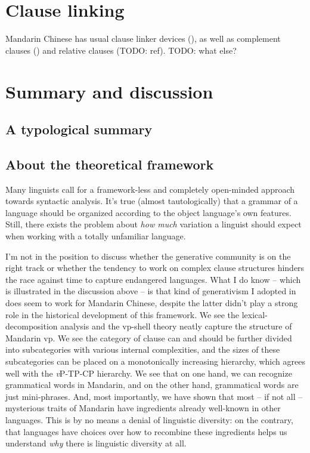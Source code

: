 \documentclass[UTF8, a4paper, oneside, scheme=plain, 12pt]{ctexrep}
\newcommand{\vP}{\textit{v}P}
\begin{document}
\chapter{Clause linking}\label{chap:clause-linking}

Mandarin Chinese has usual clause linker devices (),
as well as complement clauses ()
and relative clauses (TODO: ref). TODO: what else?

\chapter{Summary and discussion}

\section{A typological summary}

\section{About the theoretical framework}

Many linguists call for a framework-less and completely open-minded approach towards syntactic analysis.
It's true (almost tautologically) that a grammar of a language 
should be organized according to the object language's 
own features.
Still, there exists the problem about \emph{how much} variation 
a linguist should expect when working with a totally unfamiliar language.

I'm not in the position to discuss whether the generative community 
is on the right track 
or whether the tendency to work on complex clause structures 
hinders the race against time to capture 
endangered languages.
What I do know -- which is illustrated in the discussion above -- 
is that kind of generativism I adopted in 
does seem to work for Mandarin Chinese, 
despite the latter didn't play a strong role 
in the historical development of this framework.
We see the lexical-decomposition analysis 
and the \acs{vp}-shell theory 
neatly capture the structure of Mandarin \acs{vp}.
We see the category of clause can and should be 
further divided into subcategories with various internal complexities,
and the sizes of these subcategories can be placed on 
a monotonically increasing hierarchy,
which agrees well with the \vP-TP-CP hierarchy.
We see that on one hand, 
we can recognize grammatical words in Mandarin, 
and on the other hand, 
grammatical words are just mini-phrases.
And, most importantly, we have shown that most -- if not all -- mysterious traits 
of Mandarin have ingredients already well-known in other languages.
This is by no means a denial of linguistic diversity: 
on the contrary, 
that languages have choices over how to recombine these ingredients
helps us understand \emph{why} there is linguistic diversity at all.
\end{document}
